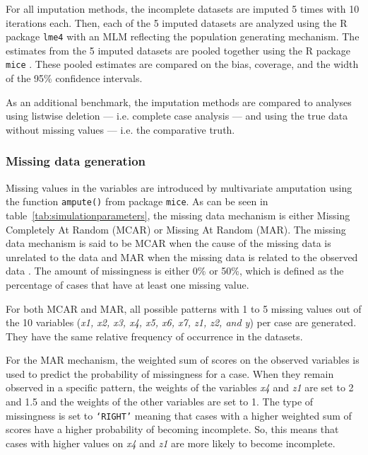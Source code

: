 \documentclass[3p,12pt,a4paper]{elsarticle}
\begin{document}
For all imputation methods, the incomplete datasets are imputed 5 times with 10 iterations each. Then, each of the 5 imputed datasets are analyzed using the R package \texttt{lme4} \citep{bates2015} with an MLM reflecting the population generating mechanism. The estimates from the 5 imputed datasets are pooled together using the R package \texttt{mice} \citep{buuren2011}. These pooled estimates are compared on the bias, coverage, and the width of the 95\% confidence intervals.

As an additional benchmark, the imputation methods are compared to analyses using listwise deletion --- i.e. complete case analysis --- and using the true data without missing values --- i.e. the comparative truth.

\subsubsection{Missing data generation}
Missing values in the variables are introduced by multivariate amputation using the function \texttt{ampute()} \citep{schouten2018} from package \texttt{mice}. As can be seen in table~\ref{tab:simulationparameters}, the missing data mechanism is either Missing Completely At Random (MCAR) or Missing At Random (MAR). The missing data mechanism is said to be MCAR when the cause of the missing data is unrelated to the data and MAR when the missing data is related to the observed data \citep{rubin1976}. The amount of missingness is either 0\% or 50\%, which is defined as the percentage of cases that have at least one missing value. 

For both MCAR and MAR, all possible patterns with 1 to 5 missing values out of the 10 variables (\textit{x1, x2, x3, x4, x5, x6, x7, z1, z2, and y}) per case are generated. They have the same relative frequency of occurrence in the datasets. %

For the MAR mechanism, the weighted sum of scores on the observed variables is used to predict the probability of missingness for a case. When they remain observed in a specific pattern, the weights of the variables \textit{x4} and \textit{z1} are set to 2 and 1.5 and the weights of the other variables are set to 1. The type of missingness is set to \texttt{`RIGHT'} meaning that cases with a higher weighted sum of scores have a higher probability of becoming incomplete. So, this means that cases with higher values on \textit{x4} and \textit{z1} are more likely to become incomplete.
\end{document}
